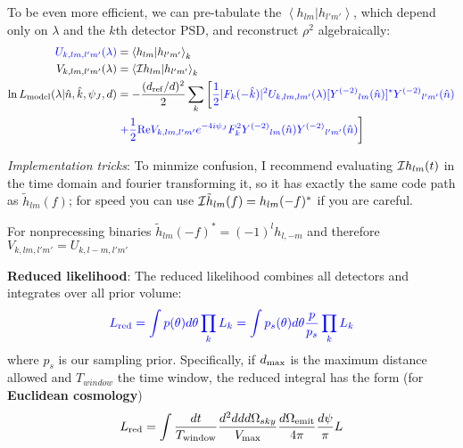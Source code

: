 \documentclass[twocolumn,prd,nofootinbib]{revtex4}
\newcommand\Y[1]{Y^{(#1)}{}}
\newcommand\qmstateproduct[2]{\left\langle#1|#2\right\rangle}
\begin{document}
\begin{widetext}
\begin{shaded}
To be even more efficient, we can pre-tabulate the $\qmstateproduct{h_{lm}}{h_{l'm'}}$, which depend only on $\lambda$
and the $k$th detector PSD, and reconstruct $\rho^2$ algebraically:
\begin{subequations}
\label{eq:ComputeRhoViaInnerProductMatrix}
\begin{align}
{\color{blue} U_{k,lm,l'm'}(\lambda)}& = \qmstateproduct{h_{lm}}{h_{l'm'}}_k \\
V_{k,lm,l'm'}(\lambda)& = \qmstateproduct{{\cal I}h_{lm}}{h_{l'm'}}_k \\
\ln L_{\rm model}(\lambda|\hat{n},\hat{k},\psi_J,d) &=
   -\frac{(d_{\rm ref}/d)^2}{2}\sum_k
\left[
{\color{blue}
 \frac{1}{2}|F_k(-\hat{k})|^2 U_{k,lm,lm'}(\lambda)[\Y{-2}_{lm}(\hat{n})]^*\Y{-2}_{l'm'}(\hat{n})
}
 \right. \nonumber \\ & \left.
 {\color{blue}
+
 \frac{1}{2} \text{Re} V_{k,lm,l'm'} e^{-4i\psi_J}F_k^2 \Y{-2}_{lm}(\hat{n})\Y{-2}_{l'm'}(\hat{n})
}
\right]
\end{align}
\end{subequations}

\noindent \emph{Implementation tricks}: To minmize confusion, I recommend evaluating ${\cal I}h_{lm}(t)$ in the time
domain and fourier transforming it, so it has exactly the same code path as $\tilde{h}_{lm}(f)$; for speed you can use
${\cal I}\tilde{h}_{lm}(f) = h_{lm}(-f)^*$ if you are careful.

For nonprecessing binaries $\tilde{h}_{lm}(-f)^*=(-1)^lh_{l,-m}$ and therefore $V_{k,lm,l'm'} = U_{k,l-m,l'm'}$
\end{shaded}

\end{widetext}




\noindent \textbf{Reduced likelihood}: The reduced likelihood combines all detectors and integrates over all prior
volume:
\begin{eqnarray}
{\color{blue} L_{\rm red} = \int p(\theta) d\theta \prod_k L_k = \int p_s(\theta) d\theta \frac{p}{p_s}\prod_k L_k }
\end{eqnarray}
where $p_s$ is our sampling prior.  Specifically, if $d_{\rm max}$ is the maximum distance allowed and $T_{window}$ the
time window, the reduced integral has the form (for \textbf{Euclidean cosmology})
\begin{eqnarray}
L_{\rm red} = \int \frac{dt}{T_{\rm window}} \frac{d^2 dd d\Omega_{sky} }{V_{\rm max}} \frac{d\Omega_{\rm
    emit}}{4\pi} \frac{d\psi}{\pi} L
\end{eqnarray}
\end{document}
